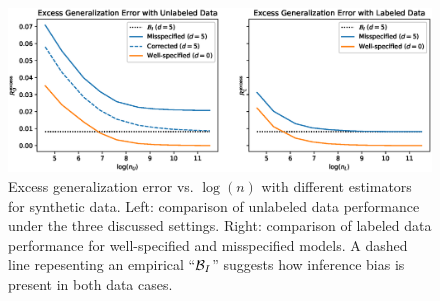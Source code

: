 \begin{figure}
    \centering
    \includegraphics[width=.48\textwidth]{eps_figures/biases.eps}
    \caption{Excess generalization error vs. $\log(n)$ with different estimators for synthetic data. Left: comparison of unlabeled data performance under the three discussed settings. Right: comparison of labeled data performance for well-specified and misspecified models. A dashed line repesenting an empirical ``$\mathcal{B}_I$'' suggests how inference bias is present in both data cases.  %
    }
    \label{fig:gen_err}
\end{figure}
